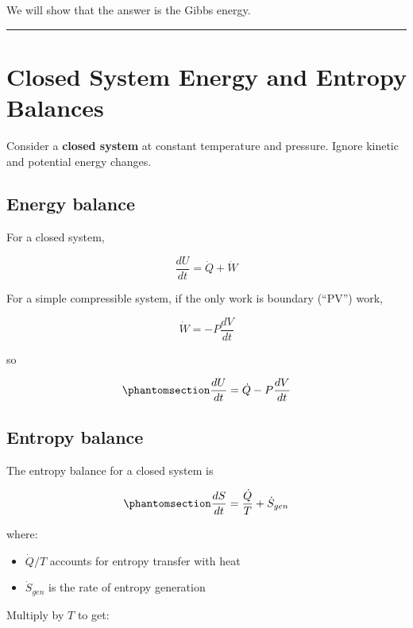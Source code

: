 \documentclass[
  letterpaper,
  DIV=11,
  numbers=noendperiod]{scrartcl}
\providecommand{\tightlist}{%
  \setlength{\itemsep}{0pt}\setlength{\parskip}{0pt}}
\begin{document}
We will show that the answer is the Gibbs energy.

\begin{center}\rule{0.5\linewidth}{0.5pt}\end{center}

\section{Closed System Energy and Entropy
Balances}\label{closed-system-energy-and-entropy-balances}

Consider a \textbf{closed system} at constant temperature and pressure.
Ignore kinetic and potential energy changes.

\subsection{Energy balance}\label{energy-balance}

For a closed system,

\[
\frac{dU}{dt} = \dot{Q} + \dot{W}
\]

For a simple compressible system, if the only work is boundary (``PV'')
work,

\[
\dot{W} = -P\frac{dV}{dt}
\]

so

\begin{equation}\phantomsection\label{eq-energy-balance}{
\frac{dU}{dt} = \dot{Q} - P\frac{dV}{dt}
}\end{equation}

\subsection{Entropy balance}\label{entropy-balance}

The entropy balance for a closed system is

\begin{equation}\phantomsection\label{eq-entropy-balance}{
\frac{dS}{dt} = \frac{\dot{Q}}{T} + \dot{S}_{gen}
}\end{equation}

where:

\begin{itemize}
\tightlist
\item
  \(\dot{Q}/T\) accounts for entropy transfer with heat
\item
  \(\dot{S}_{gen}\) is the rate of entropy generation
\end{itemize}

Multiply by \(T\) to get:
\end{document}
